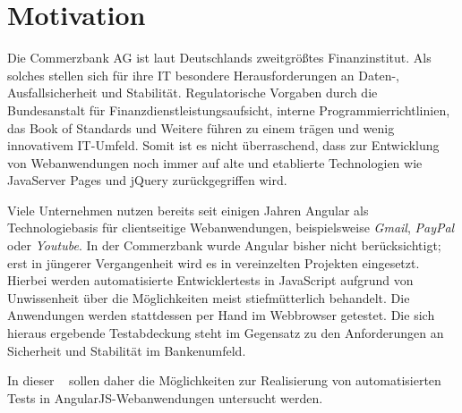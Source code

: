 \section{Motivation}\label{einleitung}
Die Commerzbank AG ist laut \textcite[][2\psqq]{handelsblatt:commerzbank} Deutschlands zweitgrößtes Finanzinstitut. Als solches stellen sich für ihre IT besondere Herausforderungen an Daten-, Ausfallsicherheit und Stabilität. Regulatorische Vorgaben durch die Bundesanstalt für Finanzdienstleistungsaufsicht\cite{bafin-banken}, interne Programmierrichtlinien\cite{coba-programmierrichtlinienAllgemein, coba-programmierrichtlinienJavaScript}, das Book of Standards \cite{coba-bookOfStandards} und Weitere führen zu einem trägen und wenig innovativem IT-Umfeld. Somit ist es nicht überraschend, dass zur Entwicklung von Webanwendungen noch immer auf alte und etablierte Technologien wie JavaServer Pages und jQuery zurückgegriffen wird.

Viele Unternehmen nutzen bereits seit einigen Jahren Angular als Technologiebasis für clientseitige Webanwendungen, beispielsweise \textit{Gmail}, \textit{PayPal} oder \textit{Youtube}. In der Commerzbank wurde Angular bisher nicht berücksichtigt; erst in jüngerer Vergangenheit wird es in vereinzelten Projekten eingesetzt. Hierbei werden automatisierte Entwicklertests in JavaScript aufgrund von Unwissenheit über die Möglichkeiten meist stiefmütterlich behandelt. Die Anwendungen werden stattdessen per Hand im Webbrowser getestet. Die sich hieraus ergebende Testabdeckung steht im Gegensatz zu den Anforderungen an Sicherheit und Stabilität im Bankenumfeld.

In dieser \titleDocument~ sollen daher die Möglichkeiten zur Realisierung von automatisierten Tests in AngularJS-Webanwendungen untersucht werden. 